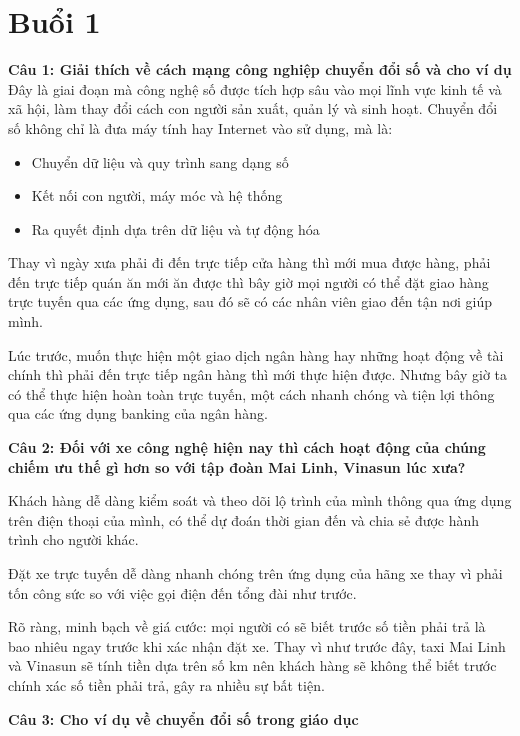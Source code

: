 \section{Buổi 1}
\textbf{Câu 1: Giải thích về cách mạng công nghiệp chuyển đổi số và cho ví dụ}\\
Đây là giai đoạn mà công nghệ số được tích hợp sâu vào mọi lĩnh vực kinh tế và xã hội, làm thay đổi cách con người sản xuất, quản lý và sinh hoạt. Chuyển đổi số không chỉ là đưa máy tính hay Internet vào sử dụng, mà là:

\begin{itemize}
	\item Chuyển dữ liệu và quy trình sang dạng số
	
	\item Kết nối con người, máy móc và hệ thống
	
	\item Ra quyết định dựa trên dữ liệu và tự động hóa
\end{itemize}

Thay vì ngày xưa phải đi đến trực tiếp cửa hàng thì mới mua được hàng, phải đến trực tiếp quán ăn mới ăn được thì bây giờ mọi người có thể đặt giao hàng trực tuyến qua các ứng dụng, sau đó sẽ có các nhân viên giao đến tận nơi giúp mình.

Lúc trước, muốn thực hiện một giao dịch ngân hàng hay những hoạt động về tài chính thì phải đến trực tiếp ngân hàng thì mới thực hiện được. Nhưng bây giờ ta có thể thực hiện hoàn toàn trực tuyến, một cách nhanh chóng và tiện lợi thông qua các ứng dụng banking của ngân hàng.

\textbf{Câu 2: Đối với xe công nghệ hiện nay thì cách hoạt động của chúng chiếm ưu thế gì hơn so với tập đoàn Mai Linh, Vinasun lúc xưa?}

Khách hàng dễ dàng kiểm soát và theo dõi lộ trình của mình thông qua ứng dụng trên điện thoại của mình, có thể dự đoán thời gian đến và chia sẻ được hành trình cho người khác.

Đặt xe trực tuyến dễ dàng nhanh chóng trên ứng dụng của hãng xe thay vì phải tốn công sức so với việc gọi điện đến tổng đài như trước.

Rõ ràng, minh bạch về giá cước: mọi người có sẽ biết trước số tiền phải trả là bao nhiêu ngay trước khi xác nhận đặt xe. Thay vì như trước đây, taxi Mai Linh và Vinasun sẽ tính tiền dựa trên số km nên khách hàng sẽ không thể biết trước chính xác số tiền phải trả, gây ra nhiều sự bất tiện.

\textbf{Câu 3: Cho ví dụ về chuyển đổi số trong giáo dục}

